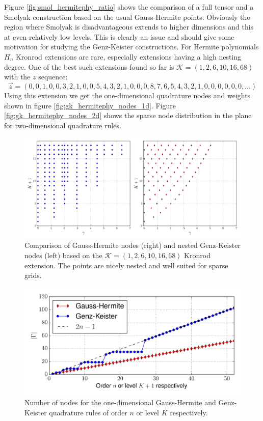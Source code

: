 \documentclass[a4paper,10pt]{article}
\begin{document}
Figure \ref{fig:smol_hermitephy_ratio} shows the comparison of a full tensor
and a Smolyak construction based on the usual Gauss-Hermite points. Obviously the region
where Smolyak is disadvantageous extends to higher dimensions and this at even relatively
low levels. This is clearly an issue and should give some motivation for studying the
Genz-Keister constructions.
For Hermite polynomials $H_n$ Kronrod extensions are rare, especially extensions
having a high nesting degree. One of the best such extensions found so far is
$\mathcal{K} = (1, 2, 6, 10, 16, 68)$ with the $z$ sequence:
\begin{equation*}
  \vec{z} = (0, 0, 1, 0, 0, 3, 2, 1, 0, 0, 5, 4, 3, 2, 1, 0, 0, 0, 8, 7,
             6, 5, 4, 3, 2, 1, 0, 0, 0, 0, 0, 0, \ldots)
\end{equation*}
Using this extension we get the one-dimensional quadrature nodes and weights shown
in figure \ref{fig:gk_hermitephy_nodes_1d}.
Figure \ref{fig:gk_hermitephy_nodes_2d} shows the sparse
node distribution in the plane for two-dimensional quadrature rules.

\begin{figure}[h]
  \centering
  \includegraphics[width=\linewidth]{./img/gk_hermitephy_nodes_cmp.pdf}
  \caption{Comparison of Gauss-Hermite nodes (right) and nested Genz-Keister nodes (left)
  based on the $\mathcal{K} = (1, 2, 6, 10, 16, 68)$ Kronrod extension. The points are
  nicely nested and well suited for sparse grids.}
  \label{fig:gk_hermitephy_nodes_cmp}
\end{figure}

\begin{figure}
  \centering
  \includegraphics[width=\linewidth]{./img/number_nodes_hermitephy.pdf}
  \caption{Number of nodes for the one-dimensional Gauss-Hermite and Genz-Keister quadrature
  rules of order $n$ or level $K$ respectively.}
  \label{fig:number_nodes_hermitephy}
\end{figure}
\end{document}
